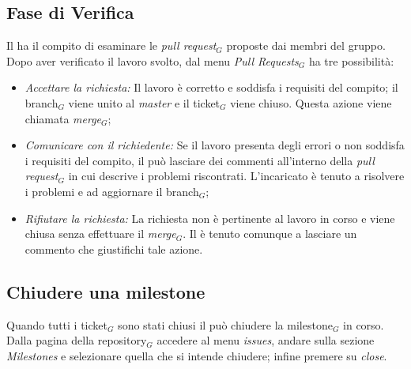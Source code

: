 \subsection{Fase di Verifica}
Il \ruoloVerificatore ha il compito di esaminare le \textit{pull request}$_G$ proposte dai membri del gruppo.\\
Dopo aver verificato il lavoro svolto, dal menu \textit{Pull Requests}$_G$ ha tre possibilità:
\begin{itemize}
\item \textit{Accettare la richiesta:} Il lavoro è corretto e soddisfa i requisiti del compito; il branch$_G$ viene unito al \textit{master} e il ticket$_G$ viene chiuso. Questa azione viene chiamata \textit{merge}$_G$;
\item \textit{Comunicare con il richiedente:} Se il lavoro presenta degli errori o non soddisfa i requisiti del compito, il \ruoloVerificatore può lasciare dei commenti all'interno della \textit{pull request}$_G$ in cui descrive i problemi riscontrati. L'incaricato è tenuto a risolvere i problemi e ad aggiornare il branch$_G$;
\item \textit{Rifiutare la richiesta:} La richiesta non è pertinente al lavoro in corso e viene chiusa senza effettuare il \textit{merge}$_G$. Il \ruoloVerificatore è tenuto comunque a lasciare un commento che giustifichi tale azione.
\end{itemize}

\subsection{Chiudere una milestone}
Quando tutti i ticket$_G$ sono stati chiusi il \ruoloResponsabile può chiudere la milestone$_G$ in corso. \\
Dalla pagina della repository$_G$ accedere al menu \textit{issues}, andare sulla sezione \textit{Milestones} e selezionare quella che si intende chiudere; infine premere su \textit{close}.
